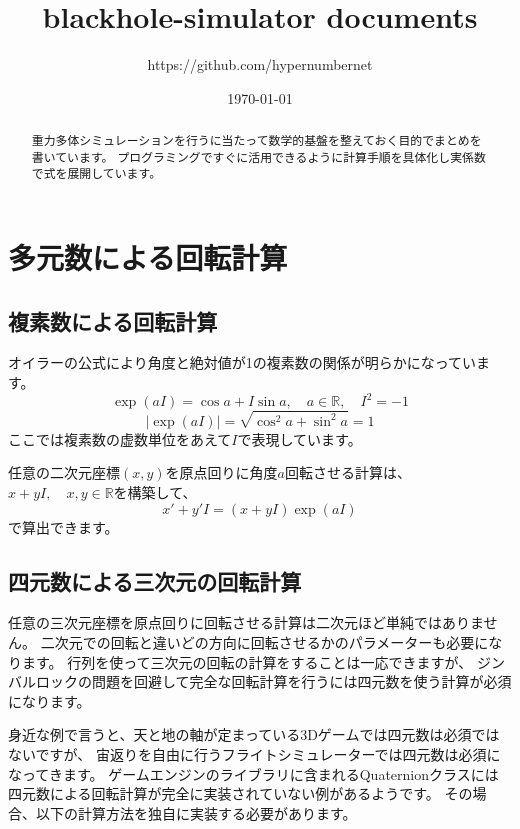 \documentclass[a4paper,12pt,notitlepage]{jsreport}
\title{blackhole-simulator documents}
\author{https://github.com/hypernumbernet}
\date{\today}
\begin{document}
\maketitle

\begin{abstract}
  重力多体シミュレーションを行うに当たって数学的基盤を整えておく目的でまとめを書いています。
  プログラミングですぐに活用できるように計算手順を具体化し実係数で式を展開しています。
\end{abstract}

\clearpage
\tableofcontents
\clearpage



\chapter{多元数による回転計算}

\section{複素数による回転計算}

オイラーの公式により角度と絶対値が1の複素数の関係が明らかになっています。
\begin{equation}
  \exp(aI)=\cos a+I\sin a,\quad a\in\mathbb{R},\quad I^2=-1
\end{equation}
\begin{equation}
  |\exp(aI)|=\sqrt{\cos^2 a+\sin^2 a}=1
\end{equation}
ここでは複素数の虚数単位をあえて$I$で表現しています。

任意の二次元座標$(x,y)$を原点回りに角度$a$回転させる計算は、$x+yI,\quad x,y\in\mathbb{R}$を構築して、
\begin{equation}
  x'+y'I=(x+yI)\exp(aI)
\end{equation}
で算出できます。

\section{四元数による三次元の回転計算}

任意の三次元座標を原点回りに回転させる計算は二次元ほど単純ではありません。
二次元での回転と違いどの方向に回転させるかのパラメーターも必要になります。
行列を使って三次元の回転の計算をすることは一応できますが、
ジンバルロックの問題を回避して完全な回転計算を行うには四元数を使う計算が必須になります。

身近な例で言うと、天と地の軸が定まっている3Dゲームでは四元数は必須ではないですが、
宙返りを自由に行うフライトシミュレーターでは四元数は必須になってきます。
ゲームエンジンのライブラリに含まれるQuaternionクラスには四元数による回転計算が完全に実装されていない例があるようです。
その場合、以下の計算方法を独自に実装する必要があります。
\end{document}
